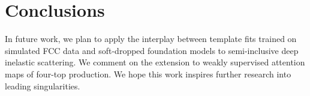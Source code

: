 \section{Conclusions}\label{sec:conclusions}

In future work, we plan to apply the interplay between template fits
trained on simulated FCC data and soft-dropped foundation models to
semi-inclusive deep inelastic scattering. We comment on the extension to
weakly supervised attention maps of four-top production. We hope this
work inspires further research into leading singularities.

